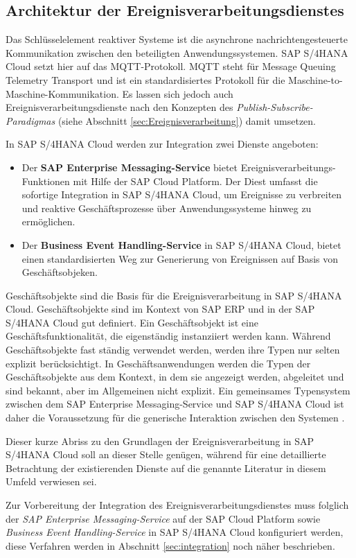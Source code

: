 \subsection{Architektur der Ereignisverarbeitungsdienstes}
Das Schlüsselelement reaktiver Systeme ist die asynchrone nachrichtengesteuerte Kommunikation zwischen den beteiligten Anwendungssystemen. SAP S/4HANA Cloud setzt hier auf das MQTT-Protokoll. MQTT steht für Message Queuing Telemetry Transport und ist ein standardisiertes Protokoll für die Maschine-to-Maschine-Kommunikation.
Es lassen sich jedoch auch Ereignisverarbeitungsdienste nach den Konzepten des \textit{Publish-Subscribe-Paradigmas} (siehe Abschnitt \ref{sec:Ereignisverarbeitung}) damit umsetzen.
\cite{Herzig.2018}

In SAP S/4HANA Cloud werden zur Integration zwei Dienste angeboten:
\begin{itemize}
    \item Der \textbf{SAP Enterprise Messaging-Service} bietet Ereignisverarbeitungs-Funktionen mit Hilfe der SAP Cloud Platform. Der Diest umfasst die sofortige Integration in SAP S/4HANA Cloud, um Ereignisse zu verbreiten und reaktive Geschäftsprozesse über Anwendungssysteme hinweg zu ermöglichen.
    \item Der \textbf{Business Event Handling-Service} in SAP S/4HANA Cloud, bietet einen standardisierten Weg zur Generierung von Ereignissen auf Basis von Geschäftsobjeken.
\end{itemize}

Geschäftsobjekte sind die Basis für die Ereignisverarbeitung in SAP S/4HANA Cloud. Geschäftsobjekte sind im Kontext von SAP ERP und in der SAP S/4HANA Cloud gut definiert. Ein Geschäftsobjekt ist eine Geschäftsfunktionalität, die eigenständig instanziiert werden kann. Während Geschäftsobjekte fast ständig verwendet werden, werden ihre Typen nur selten explizit berücksichtigt. In Geschäftsanwendungen werden die Typen der Geschäftsobjekte aus dem Kontext, in dem sie angezeigt werden, abgeleitet und sind bekannt, aber im Allgemeinen nicht explizit. Ein gemeinsames Typensystem zwischen dem SAP Enterprise Messaging-Service und SAP S/4HANA Cloud ist daher die Voraussetzung für die generische Interaktion zwischen den Systemen
\cite{Herzig.2018}. 

Dieser kurze Abriss zu den Grundlagen der Ereignisverarbeitung in SAP S/4HANA Cloud  soll an dieser Stelle genügen, während für eine detaillierte Betrachtung der existierenden Dienste auf die genannte Literatur in diesem Umfeld verwiesen sei.\cite{Herzig.2018}

Zur Vorbereitung der Integration des Ereignisverarbeitungsdienstes muss folglich der \textit{SAP Enterprise Messaging-Service} auf der SAP Cloud Platform sowie \textit{Business Event Handling-Service} in SAP S/4HANA Cloud konfiguriert werden, diese Verfahren werden in Abschnitt \ref{sec:integration} noch näher beschrieben. 